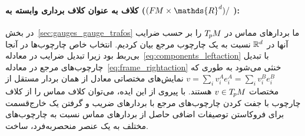 \paragraph{کلاف  به عنوان کلاف برداری وابسته به  ($(\FM\times \mathds{R}^d)/$ ):}
در بخش~\ref{sec:gauges_gauge_trafos} ما بردارهای مماس در $T_{\mkern-1.5mu p}\mkern-.5muM$ را بر حسب ضرایب آنها در $\mathbb{R}^d$ نسبت به یک چارچوب مرجع بیان کردیم.
انتخاب خاص چارچوب‌ها در آنجا بی‌ربط بود زیرا تبدیل ضرایب در معادله~\eqref{eq:components_leftaction} با تبدیل چارچوب‌های مرجع در معادله~\eqref{eq:frame_rightaction} خنثی می‌شود به طوری که $v = \sum_i v^A_i e^A_{i} = \sum_i v^B_i e^B_{i}$ نمایش‌های مختصاتی معادل از همان بردار مستقل از مختصات $v\in T_{\mkern-1.5mu p}\mkern-.5muM$ هستند.
با پیروی از این ایده، می‌توان کلاف مماس را از کلاف چارچوب با جفت کردن چارچوب‌های مرجع با بردارهای ضریب و گرفتن یک خارج‌قسمت برای فروکاستن توصیفات اضافی حاصل از بردارهای مماس نسبت به چارچوب‌های مختلف به یک عنصر منحصربه‌فرد، ساخت.

